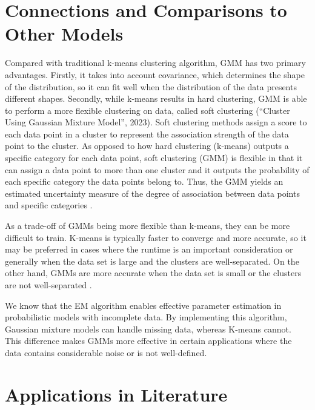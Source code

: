 \documentclass[12pt]{article}
\begin{document}
\hypertarget{connections-and-comparisons-to-other-models}{%
\section{Connections and Comparisons to Other
Models}\label{connections-and-comparisons-to-other-models}}

\label{sec:compare}

Compared with traditional k-means clustering algorithm, GMM has two
primary advantages. Firstly, it takes into account covariance, which
determines the shape of the distribution, so it can fit well when the
distribution of the data presents different shapes. Secondly, while
k-means results in hard clustering, GMM is able to perform a more
flexible clustering on data, called soft clustering (``Cluster Using
Gaussian Mixture Model'', 2023). Soft clustering methods assign a score
to each data point in a cluster to represent the association strength of
the data point to the cluster. As opposed to how hard clustering
(k-means) outputs a specific category for each data point, soft
clustering (GMM) is flexible in that it can assign a data point to more
than one cluster and it outputs the probability of each specific
category the data points belong to. Thus, the GMM yields an estimated
uncertainty measure of the degree of association between data points and
specific categories \citep{huang2023gaussian}.

As a trade-off of GMMs being more flexible than k-means, they can be
more difficult to train. K-means is typically faster to converge and
more accurate, so it may be preferred in cases where the runtime is an
important consideration or generally when the data set is large and the
clusters are well-separated. On the other hand, GMMs are more accurate
when the data set is small or the clusters are not well-separated
\citep{kumar2022gaussian}.

We know that the EM algorithm enables effective parameter estimation in
probabilistic models with incomplete data. By implementing this
algorithm, Gaussian mixture models can handle missing data, whereas
K-means cannot. This difference makes GMMs more effective in certain
applications where the data contains considerable noise or is not
well-defined.

\hypertarget{applications-in-literature}{%
\section{Applications in Literature}\label{applications-in-literature}}
\end{document}
